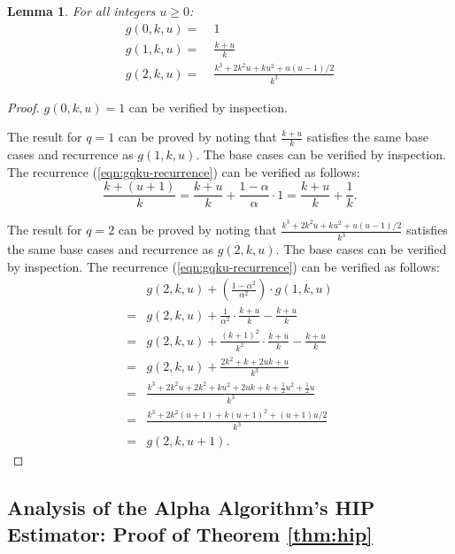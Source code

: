 \documentclass{article}
\newtheorem{lemma}[theorem]{Lemma}
\begin{document}
\begin{lemma}\label{lemma:gqku-formulas}
For all integers $u \geq 0$: 
\begin{align*}
g(0,k,u) = & \;1 \\
g(1,k,u) = & \;\frac{k+u}{k} \\
g(2,k,u) = & \;\frac{k^3 + 2 k^2 u + ku^2 + u(u\!-\!1)/2}{k^3}
\end{align*}
\end{lemma}
\begin{proof}
$g(0,k,u) =1$ can be verified by inspection.

\vspace{0.5em}
\noindent The result for $q=1$ can be proved by noting that
$\frac{k+u}{k}$ satisfies the same base cases and recurrence as $g(1,k,u)$.
The base cases can be verified by inspection. The recurrence (\ref{eqn:gqku-recurrence})
can be verified as follows:
\begin{equation*}
\frac{k+(u+1)}{k} = \frac{k+u}{k} + \frac{1-\alpha}{\alpha} \cdot 1 = \frac{k+u}{k} + \frac{1}{k}.
\end{equation*}

\vspace{0.5em}
\noindent The result for $q=2$ can be proved by noting that
$\frac{k^3 + 2 k^2 u + ku^2 + u(u\!-\!1)/2}{k^3}$ satisfies the same base cases and recurrence as $g(2,k,u)$.
The base cases can be verified by inspection. The recurrence (\ref{eqn:gqku-recurrence})
can be verified as follows:
\begin{align*}
   & g(2,k,u) + \left(\frac{1-\alpha^2}{\alpha^2}\right) \cdot g(1,k,u) \\
 = & g(2,k,u) + \frac{1}{\alpha^2} \cdot \frac{k+u}{k} - \frac{k+u}{k} \\
 = & g(2,k,u) + \frac{(k+1)^2}{k^2} \cdot \frac{k+u}{k} - \frac{k+u}{k} \\
 = & g(2,k,u) + \frac{2k^2+k+2uk+u}{k^3} \\
 = & \frac{k^3 + 2k^2u +2k^2 + ku^2 + 2uk + k + \frac{1}{2} u^2 + \frac{1}{2} u}{k^3} \\
 = & \frac{k^3 + 2k^2(u+1) + k(u+1)^2 + (u+1)u/2}{k^3} \\
 = & g(2,k,u+1).
\end{align*}
\end{proof}

\subsection{Analysis of the Alpha Algorithm's HIP Estimator: Proof of Theorem \ref{thm:hip}}
\label{app:hip}
\end{document}
